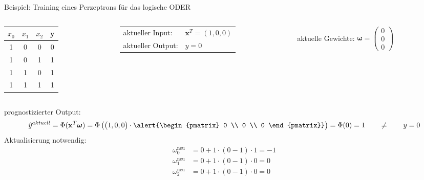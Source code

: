 \documentclass[11pt, aspectratio=169, t]{beamer}
\begin{document}
\begin{frame}{Beispiel: Training eines Perzeptrons für das logische ODER}
\begin{small}
\begin{columns}
\begin{column}{0.25\textwidth}
\hspace{0.5cm}
\begin{footnotesize}
\begin{tabular}{cccc} \toprule
$x_0$ & $x_1$ & $x_2$ & y \\ \midrule
1 & 0 & 0 & 0 \\
1 & 0 & 1 & 1 \\
1 & 1 & 0 & 1 \\
1 & 1 & 1 & 1 \\ \bottomrule
\end{tabular} \end{footnotesize}
\end{column}
\begin{column}{0.4\textwidth}
\begin{tabular}{ll}
aktueller Input: & $\mathbf{x}^{T} = (1, 0, 0)$ \\
aktueller Output: & $y=0$ \\
\end{tabular}
\end{column}
\begin{column}{0.4\textwidth}
aktuelle Gewichte: \alert{ $\boldsymbol{\omega} = \begin{pmatrix} 0 \\ 0 \\ 0 \end{pmatrix}$ }
\end{column}
\end{columns}
prognostizierter Output:
\[\hat{y}^{aktuell} = \Phi(\mathbf{x}^{T}\boldsymbol{\omega}) = \Phi\left( \begin{pmatrix} 1, 0, 0 \end{pmatrix}\cdot \alert{\begin{pmatrix} 0 \\ 0 \\ 0 \end{pmatrix}} \right) = \Phi(0) = 1 \qquad \neq \qquad y = 0\]
Aktualisierung notwendig:
\begin{align*}
\omega_0^{\text{neu}} &= 0 + 1\cdot (0-1)\cdot 1 = -1\\
\omega_1^{\text{neu}} &= 0 + 1\cdot (0-1)\cdot 0 = 0\\
\omega_2^{\text{neu}} &= 0 + 1\cdot (0-1)\cdot 0 = 0
\end{align*}
\end{small}
\end{frame}
\end{document}
